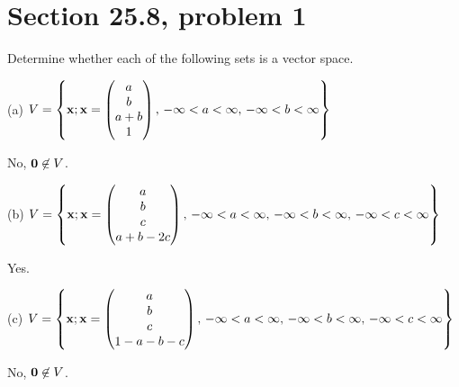 \section{Section 25.8, problem 1}
Determine whether each of the following sets is a vector space.

\bigskip
\noindent
(a) $\displaystyle{
V=\left\{
{\bf x}; {\bf x}=\left(\begin{matrix}
a\cr
b\cr
a+b\cr
1
\end{matrix}\right),\,
-\infty<a<\infty,\,
-\infty<b<\infty
\right\}}$

\bigskip
\noindent
No, ${\bf 0}\not\in V$.

\bigskip
\noindent
(b) $\displaystyle{
V=\left\{
{\bf x}; {\bf x}=\left(\begin{matrix}
a\cr
b\cr
c\cr
a+b-2c
\end{matrix}\right),\,
-\infty<a<\infty,\,
-\infty<b<\infty,\,
-\infty<c<\infty
\right\}}$

\bigskip
\noindent
Yes.

\bigskip
\noindent
(c) $\displaystyle{
V=\left\{
{\bf x}; {\bf x}=\left(\begin{matrix}
a\cr
b\cr
c\cr
1-a-b-c
\end{matrix}\right),\,
-\infty<a<\infty,\,
-\infty<b<\infty,\,
-\infty<c<\infty
\right\}}$

\bigskip
\noindent
No, ${\bf 0}\not\in V$.
